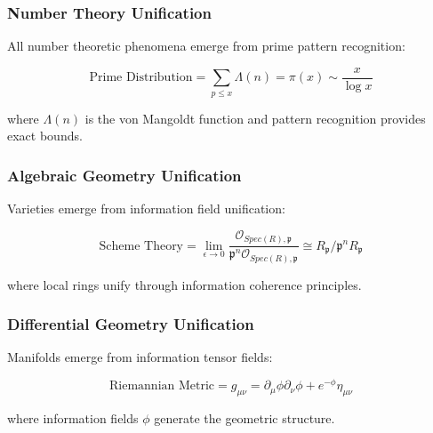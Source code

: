 \subsubsection{Number Theory Unification}

\begin{theorem}
All number theoretic phenomena emerge from prime pattern recognition:

\begin{equation}
\text{Prime Distribution} = \sum_{p \leq x} \Lambda(n) = \pi(x) \sim \frac{x}{\log x}
\end{equation}

where $\Lambda(n)$ is the von Mangoldt function and pattern recognition provides exact bounds.
\end{theorem}

\subsubsection{Algebraic Geometry Unification}

\begin{theorem}
Varieties emerge from information field unification:

\begin{equation}
\text{Scheme Theory} = \lim_{\epsilon \to 0} \frac{\mathcal{O}_{Spec(R),\mathfrak{p}}}{\mathfrak{p}^n \mathcal{O}_{Spec(R),\mathfrak{p}}} \cong R_{\mathfrak{p}}/\mathfrak{p}^n R_{\mathfrak{p}}
\end{equation}

where local rings unify through information coherence principles.
\end{theorem}

\subsubsection{Differential Geometry Unification}

\begin{theorem}
Manifolds emerge from information tensor fields:

\begin{equation}
\text{Riemannian Metric} = g_{\mu\nu} = \partial_\mu \phi \partial_\nu \phi + e^{-\phi} \eta_{\mu\nu}
\end{equation}

where information fields $\phi$ generate the geometric structure.
\end{theorem}

